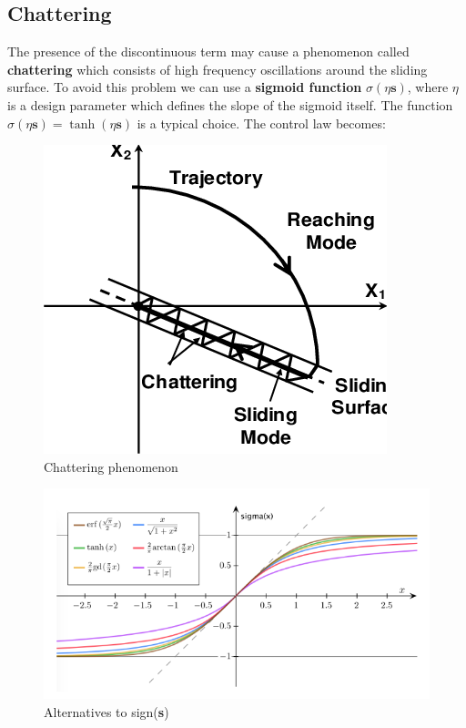 \subsection{Chattering}
The presence of the discontinuous term may cause a phenomenon called \textbf{chattering} which consists of high frequency oscillations around the sliding surface. To avoid this problem we can use a \textbf{sigmoid function} $\sigma(\eta \textbf{s})$, where $\eta$ is a design parameter which defines the slope of the sigmoid itself. The function $\sigma(\eta\textbf{s})=\tanh{(\eta\textbf{s})}$ is a typical choice. The control law becomes:\\

\begin{figure}[h]
    \centering
    \includegraphics[scale=0.7]{NonLinearControl/images/Chattering.png}
    \caption{Chattering phenomenon}
    \label{fig:enter-label}
\end{figure}

\hspace*{-5mm}
%
\begin{figure}[h]
    \centering
    \includegraphics{NonLinearControl/images/sigmoids.png}
    \caption{Alternatives to sign(\textbf{s})}
    \label{fig:enter-label}
\end{figure}


